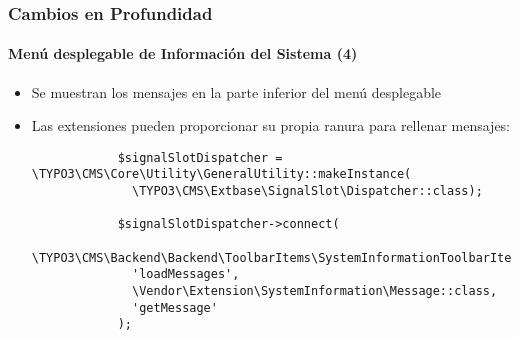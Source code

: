 \begin{frame}[fragile]
	\frametitle{Cambios en Profundidad}
	\framesubtitle{Menú desplegable de Información del Sistema (4)}

	\lstset{basicstyle=\tiny\ttfamily}

	\begin{itemize}

		\item Se muestran los mensajes en la parte inferior del menú desplegable

		\item Las extensiones pueden proporcionar su propia ranura para rellenar mensajes:

		\begin{lstlisting}
			$signalSlotDispatcher = \TYPO3\CMS\Core\Utility\GeneralUtility::makeInstance(
			  \TYPO3\CMS\Extbase\SignalSlot\Dispatcher::class);

			$signalSlotDispatcher->connect(
			  \TYPO3\CMS\Backend\Backend\ToolbarItems\SystemInformationToolbarItem::class,
			  'loadMessages',
			  \Vendor\Extension\SystemInformation\Message::class,
			  'getMessage'
			);
		\end{lstlisting}

	\end{itemize}

\end{frame}

